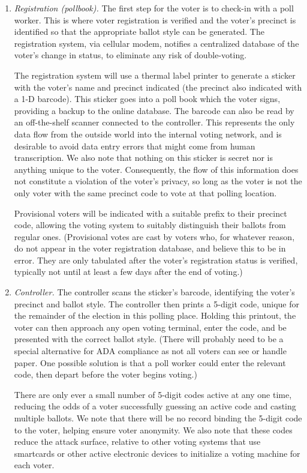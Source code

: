 \begin{enumerate}
\item {\em Registration (pollbook).}
The first step for the voter is to check-in with a poll worker. This
is where voter registration is verified and the voter's precinct is
identified so that the appropriate ballot style can be generated. 
The registration system, via cellular modem, notifies a centralized
database of the voter's change in status, to eliminate any risk of
double-voting.

The registration system will
use a thermal label printer to generate a sticker with the
voter's name and precinct indicated (the precinct also indicated with
a 1-D barcode). This sticker goes into a poll book which
the voter signs, providing a backup to the online database.
The barcode can also be read by an off-the-shelf scanner connected to
the controller. This represents the only data flow from the outside
world into the internal voting network, and is desirable to avoid data
entry errors that might come from human transcription. We also note
that nothing on this sticker is secret nor is anything unique to the
voter. Consequently, the flow of this information does not constitute a violation
of the voter's privacy, so long as the voter is not the only voter
with the same precinct code to vote at that polling location.

Provisional voters will be indicated with a suitable prefix to their
precinct code, allowing the voting system to suitably distinguish
their ballots from regular ones. (Provisional votes are cast by voters
who, for whatever reason, do not appear in the voter registration
database, and believe this to be in error. They are only tabulated
after the voter's registration status is verified, typically not until
at least a few days after the end of voting.)

\item {\em Controller.}
The controller scans the sticker's barcode, identifying the voter's
precinct and ballot style. The controller then prints a 5-digit code,
unique for the remainder of the election in this polling
place. Holding this printout, the voter can then approach any open
voting terminal, enter the code, and be presented with the correct
ballot style. 
(There will probably need to be a special alternative for ADA
compliance as not all voters can see or handle paper. One possible
solution is that a poll worker could enter the relevant code, then
depart before the voter begins voting.)

There are only ever a small number of 5-digit codes active at any one
time, reducing the odds of a voter successfully guessing an active
code and casting multiple ballots.
We note that there will be no record binding the 5-digit code to the
voter, helping ensure voter anonymity. We also note that these codes
reduce the attack surface, relative to other voting systems that use
smartcards or other active electronic devices to initialize a voting
machine for each voter.


\end{enumerate}
